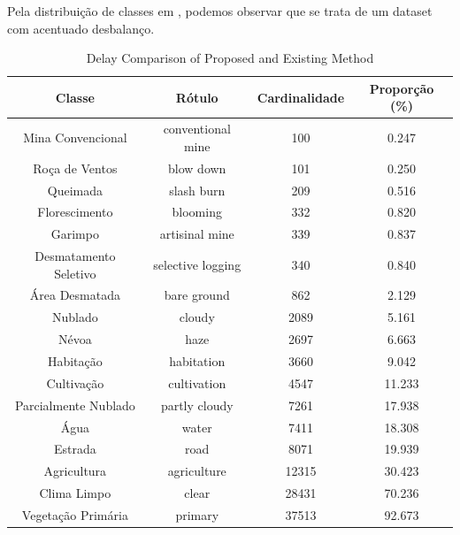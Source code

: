 Pela distribuição de classes em , podemos observar que se trata de um dataset com acentuado desbalanço. 

\begin{table}[h!]
    \caption{Delay Comparison of Proposed and Existing Method}
    \centering
\begin{tabular}{*{4}{c}}
    \toprule
    Classe                  &            Rótulo &  Cardinalidade &  Proporção (\%) \\
    \midrule
    Mina Convencional       & conventional mine &    100 &       0.247 \\
    Roça de Ventos          &         blow down &    101 &       0.250 \\
    Queimada                &        slash burn &    209 &       0.516 \\
    Florescimento           &          blooming &    332 &       0.820 \\
    Garimpo                 &    artisinal mine &    339 &       0.837 \\
    Desmatamento Seletivo   & selective logging &    340 &       0.840 \\
    Área Desmatada          &       bare ground &    862 &       2.129 \\
    Nublado                 &            cloudy &   2089 &       5.161 \\
    Névoa                   &              haze &   2697 &       6.663 \\
    Habitação               &        habitation &   3660 &       9.042 \\
    Cultivação              &       cultivation &   4547 &      11.233 \\
    Parcialmente Nublado    &     partly cloudy &   7261 &      17.938 \\
    Água                    &             water &   7411 &      18.308 \\
    Estrada                 &              road &   8071 &      19.939 \\
    Agricultura             &       agriculture &  12315 &      30.423 \\
    Clima Limpo             &             clear &  28431 &      70.236 \\
    Vegetação Primária      &           primary &  37513 &      92.673 \\
    \bottomrule
\end{tabular}
\label{tab1}
\end{table}

